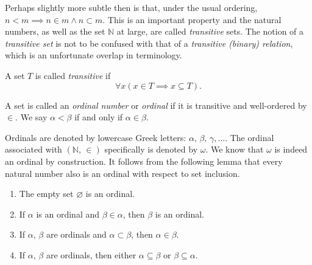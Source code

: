 \documentclass[../../main.tex]{subfiles}
\begin{document}
Perhaps slightly more subtle then is that, under the usual ordering, $n < m \implies n \in m \wedge n \subset m$.
This is an important property and the natural numbers, as well as the set $\mathbb{N}$ at large, are called \textit{transitive} sets.
The notion of a \textit{transitive set} is not to be confused with that of a \textit{transitive (binary) relation}, which is an unfortunate overlap in terminology.

\begin{definition}\cite[p.14]{Jec78}
    A set $T$ is called \textit{transitive} if $$\forall x \left(x \in T \implies x \subseteq T\right).$$
\end{definition}

\begin{definition}\cite[p.14]{Jec78}
    A set is called an \textit{ordinal number} or \textit{ordinal} if it is transitive and well-ordered by $\in$.
    We say $\alpha < \beta$ if and only if $\alpha \in \beta$.
\end{definition}

Ordinals are denoted by lowercase Greek letters: $\alpha,\, \beta,\, \gamma,\ldots.$
The ordinal associated with $\left(\mathbb{N},\, \in\right)$ specifically is denoted by $\omega$.
We know that $\omega$ is indeed an ordinal by construction.
It follows from the following lemma that every natural number also is an ordinal with respect to set inclusion.

\begin{lemma}\cite[Lemma 2.3, p.15]{Jec78}
    \begin{enumerate}
        \item The empty set $\varnothing$ is an ordinal.
        \item If $\alpha$ is an ordinal and $\beta \in \alpha$, then $\beta$ is an ordinal.
        \item If $\alpha,\, \beta$ are ordinals and $\alpha \subset \beta$, then $\alpha \in \beta$.
        \item If $\alpha,\, \beta$ are ordinals, then either  $\alpha \subseteq \beta$ or $\beta \subseteq \alpha$.
    \end{enumerate}
\end{lemma}
\end{document}

